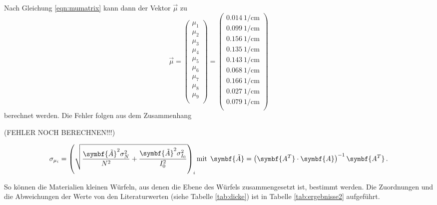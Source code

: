 Nach Gleichung \eqref{eqn:mumatrix} kann dann der Vektor $\vec{\mu}$ zu
\begin{equation*}
  \vec{\mu}=
  \left(
      \begin{array}{r}
        \mu_1 \\
        \mu_2 \\
        \mu_3 \\
        \mu_4 \\
        \mu_5 \\
        \mu_6 \\
        \mu_7 \\
        \mu_8 \\
        \mu_9 \\
      \end{array}
      \right)=
  \left(
      \begin{array}{r}
        \SI{0.014}{1\per\centi\metre} \\
        \SI{0.099}{1\per\centi\metre} \\
        \SI{0.156}{1\per\centi\metre} \\
        \SI{0.135}{1\per\centi\metre} \\
        \SI{0.143}{1\per\centi\metre} \\
        \SI{0.068}{1\per\centi\metre} \\
        \SI{0.166}{1\per\centi\metre} \\
        \SI{0.027}{1\per\centi\metre} \\
        \SI{0.079}{1\per\centi\metre} \\
      \end{array}
      \right)
\end{equation*}
berechnet werden. Die Fehler folgen aus dem Zusammenhang

(FEHLER NOCH BERECHNEN!!!)

\begin{equation}
  \sigma_{\mu_i} = \left(\sqrt{\frac{\symbf{\tilde{A}}^2 \sigma_{N}^2}{N^2} + \frac{\symbf{\tilde{A}}^{2} \sigma_{I_{0}}^2}{I_{0}^2}}\right)_i \\
  \text{mit}\:\: \symbf{\tilde{A}} = \left(\symbf{A^T} \cdot \symbf{A}\right)^{-1} \symbf{A^T}\,.
\end{equation}

So können die Materialien kleinen Würfeln, aus denen die Ebene des Würfels zusammengesetzt ist, bestimmt werden. Die Zuordnungen und die Abweichungen der Werte von den Literaturwerten (siehe Tabelle \ref{tab:dicke}) ist in Tabelle \ref{tab:ergebnisse2} aufgeführt.


